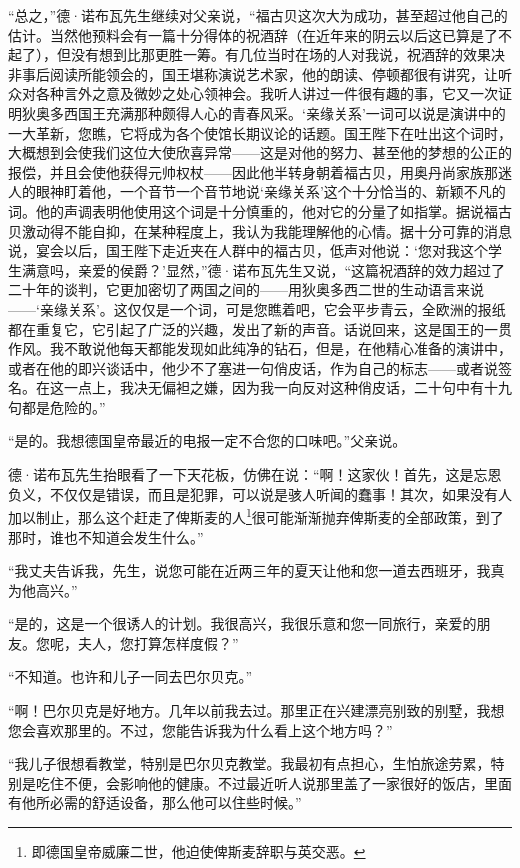 \par “总之，”德·诺布瓦先生继续对父亲说，“福古贝这次大为成功，甚至超过他自己的估计。当然他预料会有一篇十分得体的祝酒辞（在近年来的阴云以后这已算是了不起了），但没有想到比那更胜一筹。有几位当时在场的人对我说，祝酒辞的效果决非事后阅读所能领会的，国王堪称演说艺术家，他的朗读、停顿都很有讲究，让听众对各种言外之意及微妙之处心领神会。我听人讲过一件很有趣的事，它又一次证明狄奥多西国王充满那种颇得人心的青春风采。‘亲缘关系’一词可以说是演讲中的一大革新，您瞧，它将成为各个使馆长期议论的话题。国王陛下在吐出这个词时，大概想到会使我们这位大使欣喜异常——这是对他的努力、甚至他的梦想的公正的报偿，并且会使他获得元帅权杖——因此他半转身朝着福古贝，用奥丹尚家族那迷人的眼神盯着他，一个音节一个音节地说‘亲缘关系’这个十分恰当的、新颖不凡的词。他的声调表明他使用这个词是十分慎重的，他对它的分量了如指掌。据说福古贝激动得不能自抑，在某种程度上，我认为我能理解他的心情。据十分可靠的消息说，宴会以后，国王陛下走近夹在人群中的福古贝，低声对他说：‘您对我这个学生满意吗，亲爱的侯爵？’显然，”德·诺布瓦先生又说，“这篇祝酒辞的效力超过了二十年的谈判，它更加密切了两国之间的——用狄奥多西二世的生动语言来说——‘亲缘关系’。这仅仅是一个词，可是您瞧着吧，它会平步青云，全欧洲的报纸都在重复它，它引起了广泛的兴趣，发出了新的声音。话说回来，这是国王的一贯作风。我不敢说他每天都能发现如此纯净的钻石，但是，在他精心准备的演讲中，或者在他的即兴谈话中，他少不了塞进一句俏皮话，作为自己的标志——或者说签名。在这一点上，我决无偏袒之嫌，因为我一向反对这种俏皮话，二十句中有十九句都是危险的。”
\par “是的。我想德国皇帝最近的电报一定不合您的口味吧。”父亲说。
\par 德·诺布瓦先生抬眼看了一下天花板，仿佛在说：“啊！这家伙！首先，这是忘恩负义，不仅仅是错误，而且是犯罪，可以说是骇人听闻的蠢事！其次，如果没有人加以制止，那么这个赶走了俾斯麦的人\footnote{即德国皇帝威廉二世，他迫使俾斯麦辞职与英交恶。}很可能渐渐抛弃俾斯麦的全部政策，到了那时，谁也不知道会发生什么。”
\par “我丈夫告诉我，先生，说您可能在近两三年的夏天让他和您一道去西班牙，我真为他高兴。”
\par “是的，这是一个很诱人的计划。我很高兴，我很乐意和您一同旅行，亲爱的朋友。您呢，夫人，您打算怎样度假？”
\par “不知道。也许和儿子一同去巴尔贝克。”
\par “啊！巴尔贝克是好地方。几年以前我去过。那里正在兴建漂亮别致的别墅，我想您会喜欢那里的。不过，您能告诉我为什么看上这个地方吗？”
\par “我儿子很想看教堂，特别是巴尔贝克教堂。我最初有点担心，生怕旅途劳累，特别是吃住不便，会影响他的健康。不过最近听人说那里盖了一家很好的饭店，里面有他所必需的舒适设备，那么他可以住些时候。”
